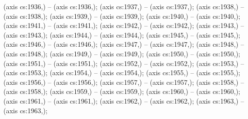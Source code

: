  (axis cs:1936,\ymin) -- (axis cs:1936,\ymax);
 (axis cs:1937,\ymin) -- (axis cs:1937,\ymax);
 (axis cs:1938,\ymin) -- (axis cs:1938,\ymax);
 (axis cs:1939,\ymin) -- (axis cs:1939,\ymax);
 (axis cs:1940,\ymin) -- (axis cs:1940,\ymax);
 (axis cs:1941,\ymin) -- (axis cs:1941,\ymax);
 (axis cs:1942,\ymin) -- (axis cs:1942,\ymax);
 (axis cs:1943,\ymin) -- (axis cs:1943,\ymax);
 (axis cs:1944,\ymin) -- (axis cs:1944,\ymax);
 (axis cs:1945,\ymin) -- (axis cs:1945,\ymax);
 (axis cs:1946,\ymin) -- (axis cs:1946,\ymax);
 (axis cs:1947,\ymin) -- (axis cs:1947,\ymax);
 (axis cs:1948,\ymin) -- (axis cs:1948,\ymax);
 (axis cs:1949,\ymin) -- (axis cs:1949,\ymax);
 (axis cs:1950,\ymin) -- (axis cs:1950,\ymax);
 (axis cs:1951,\ymin) -- (axis cs:1951,\ymax);
 (axis cs:1952,\ymin) -- (axis cs:1952,\ymax);
 (axis cs:1953,\ymin) -- (axis cs:1953,\ymax);
 (axis cs:1954,\ymin) -- (axis cs:1954,\ymax);
 (axis cs:1955,\ymin) -- (axis cs:1955,\ymax);
 (axis cs:1956,\ymin) -- (axis cs:1956,\ymax);
 (axis cs:1957,\ymin) -- (axis cs:1957,\ymax);
 (axis cs:1958,\ymin) -- (axis cs:1958,\ymax);
 (axis cs:1959,\ymin) -- (axis cs:1959,\ymax);
 (axis cs:1960,\ymin) -- (axis cs:1960,\ymax);
 (axis cs:1961,\ymin) -- (axis cs:1961,\ymax);
 (axis cs:1962,\ymin) -- (axis cs:1962,\ymax);
 (axis cs:1963,\ymin) -- (axis cs:1963,\ymax);
